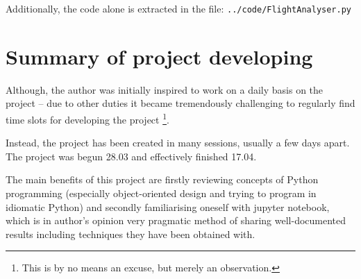 \documentclass[a4paper,10pt]{article}
\begin{document}
Additionally, the code alone is extracted in the file: \texttt{../code/FlightAnalyser.py}

\section{Summary of project developing}
Although, the author was initially inspired to work on a daily basis on the project -- due to other duties it became tremendously challenging to regularly find time slots for developing the project \footnote{This is by no means an excuse, but merely an observation.}.

Instead, the project has been created in many sessions, usually a few days apart. The project was begun 28.03 and effectively finished 17.04.

The main benefits of this project are firstly reviewing concepts of Python programming (especially object-oriented design and trying to program in idiomatic Python) and secondly familiarising oneself with jupyter notebook, which is in author's opinion very pragmatic method of sharing well-documented results including techniques they have been obtained with.
\end{document}
